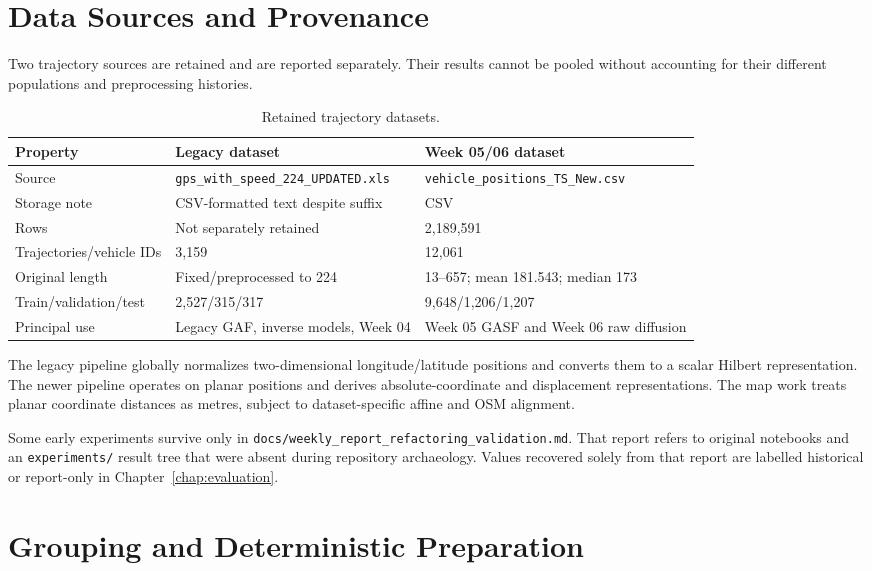\documentclass[12pt,a4paper,oneside]{report}
\begin{document}
\section{Data Sources and Provenance}

Two trajectory sources are retained and are reported separately. Their results cannot be pooled without accounting for their different populations and preprocessing histories.

\begin{table}[htbp]
\centering
\caption{Retained trajectory datasets.}
\label{tab:datasets}
\small
\begin{tabular}{L{0.25\textwidth}L{0.31\textwidth}L{0.35\textwidth}}
\toprule
Property & Legacy dataset & Week 05/06 dataset \\
\midrule
Source & \texttt{gps\_with\_speed\_224\_UPDATED.xls} & \texttt{vehicle\_positions\_TS\_New.csv} \\
Storage note & CSV-formatted text despite suffix & CSV \\
Rows & Not separately retained & 2,189,591 \\
Trajectories/vehicle IDs & 3,159 & 12,061 \\
Original length & Fixed/preprocessed to 224 & 13--657; mean 181.543; median 173 \\
Train/validation/test & 2,527/315/317 & 9,648/1,206/1,207 \\
Principal use & Legacy GAF, inverse models, Week 04 & Week 05 GASF and Week 06 raw diffusion \\
\bottomrule
\end{tabular}
\end{table}

The legacy pipeline globally normalizes two-dimensional longitude/latitude positions and converts them to a scalar Hilbert representation. The newer pipeline operates on planar positions and derives absolute-coordinate and displacement representations. The map work treats planar coordinate distances as metres, subject to dataset-specific affine and OSM alignment.

Some early experiments survive only in \texttt{docs/weekly\_report\_refactoring\_validation.md}. That report refers to original notebooks and an \texttt{experiments/} result tree that were absent during repository archaeology. Values recovered solely from that report are labelled historical or report-only in Chapter~\ref{chap:evaluation}.

\section{Grouping and Deterministic Preparation}
\end{document}
